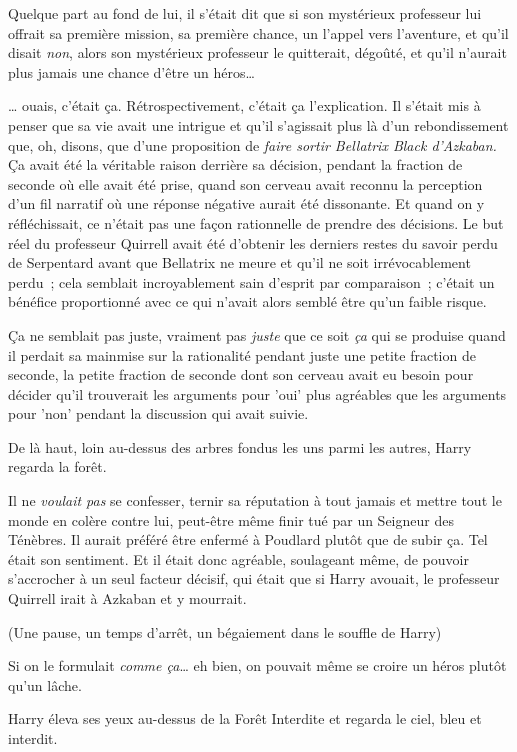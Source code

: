 Quelque part au fond de lui, il s'était dit que si son mystérieux professeur lui offrait sa première mission, sa première chance, un l'appel vers l'aventure, et qu'il disait \emph{non}, alors son mystérieux professeur le quitterait, dégoûté, et qu'il n'aurait plus jamais une chance d'être un héros…

… ouais, c'était ça. Rétrospectivement, c'était ça l'explication. Il s'était mis à penser que sa vie avait une intrigue et qu'il s'agissait plus là d'un rebondissement que, oh, disons, que d'une proposition de \emph{faire sortir Bellatrix Black d'Azkaban.} Ça avait été la véritable raison derrière sa décision, pendant la fraction de seconde où elle avait été prise, quand son cerveau avait reconnu la perception d'un fil narratif où une réponse négative aurait été dissonante. Et quand on y réfléchissait, ce n'était pas une façon rationnelle de prendre des décisions. Le but réel du professeur Quirrell avait été d'obtenir les derniers restes du savoir perdu de Serpentard avant que Bellatrix ne meure et qu'il ne soit irrévocablement perdu~; cela semblait incroyablement sain d'esprit par comparaison~; c'était un bénéfice proportionné avec ce qui n'avait alors semblé être qu'un faible risque.

Ça ne semblait pas juste, vraiment pas \emph{juste} que ce soit \emph{ça} qui se produise quand il perdait sa mainmise sur la rationalité pendant juste une petite fraction de seconde, la petite fraction de seconde dont son cerveau avait eu besoin pour décider qu'il trouverait les arguments pour 'oui' plus agréables que les arguments pour 'non' pendant la discussion qui avait suivie.

De là haut, loin au-dessus des arbres fondus les uns parmi les autres, Harry regarda la forêt.

Il ne \emph{voulait pas} se confesser, ternir sa réputation à tout jamais et mettre tout le monde en colère contre lui, peut-être même finir tué par un Seigneur des Ténèbres. Il aurait préféré être enfermé à Poudlard plutôt que de subir ça. Tel était son sentiment. Et il était donc agréable, soulageant même, de pouvoir s'accrocher à un seul facteur décisif, qui était que si Harry avouait, le professeur Quirrell irait à Azkaban et y mourrait.

(Une pause, un temps d'arrêt, un bégaiement dans le souffle de Harry)

Si on le formulait \emph{comme ça}… eh bien, on pouvait même se croire un héros plutôt qu'un lâche.

Harry éleva ses yeux au-dessus de la Forêt Interdite et regarda le ciel, bleu et interdit.

